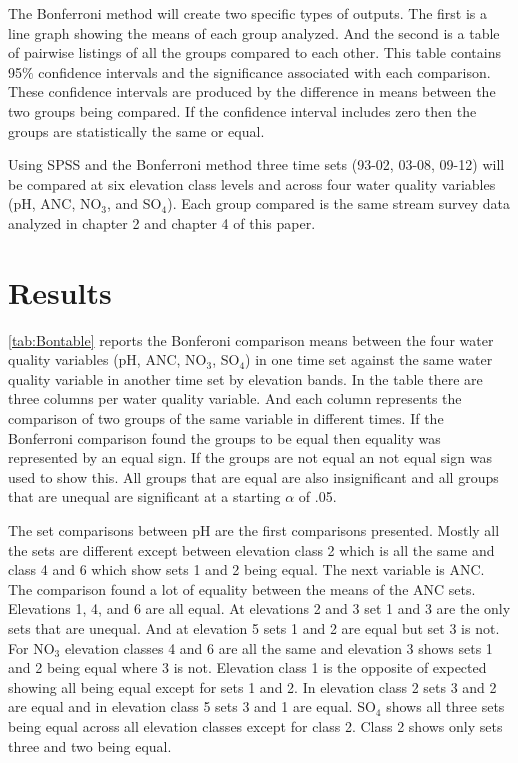 The Bonferroni method will create two specific types of outputs.
The first is a line graph showing the means of each group analyzed.
And the second is  a table of pairwise listings of all the groups compared to each other.
This table contains 95$\%$ confidence intervals and the significance associated with each comparison.
These confidence intervals are produced by the difference in means between the two groups being compared.
If the confidence interval includes zero then the groups are statistically the same or equal.

Using SPSS and the Bonferroni method three time sets (93-02, 03-08, 09-12) will be compared at six elevation class levels and across four water quality variables (pH, ANC, NO$_3$, and SO$_4 $).
Each group compared is the same stream survey data analyzed in chapter 2 and chapter 4 of this paper.

\section{Results}

\autoref{tab:Bontable} reports the Bonferoni comparison means between the four water quality variables (pH, ANC, NO$_3$, SO$_4$) in one time set against the same water quality variable in another time set by elevation bands.
In the table there are three columns per water quality variable.
And each column represents the comparison of two groups of the same variable in different times.
If the Bonferroni comparison found the groups to be equal then equality was represented by an equal sign.
If the groups are not equal an not equal sign was used to show this.
All groups that are equal are also insignificant and all groups that are unequal are significant at a starting $ \alpha$ of .05.

The set comparisons between pH are the first comparisons presented.  
Mostly all the sets are different except between elevation class 2 which is all the same and class 4 and 6 which show sets 1 and 2 being equal.  
The next variable is ANC.  
The comparison found a lot of equality between the means of the ANC sets.  
Elevations 1, 4, and 6 are all equal.  
At elevations 2 and 3 set 1 and 3 are the only sets that are unequal. 
And at elevation 5 sets 1 and 2 are equal but set 3 is not.
For NO$_3$ elevation classes 4 and 6 are all the same and elevation 3 shows sets 1 and 2 being equal where 3 is not.  
Elevation class 1 is the opposite of expected showing all being equal except for sets 1 and 2.  
In elevation class 2 sets 3 and 2 are equal and in elevation class 5 sets 3 and 1 are equal.
SO$_4$ shows all three sets being equal across all elevation classes except for class 2.  
Class 2 shows only sets three and two being equal.

